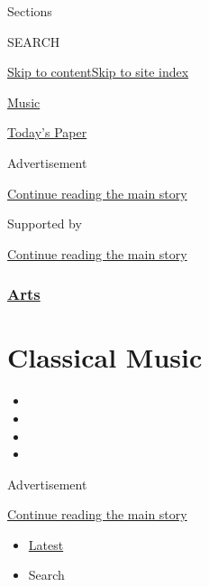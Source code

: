 Sections

SEARCH

\protect\hyperlink{site-content}{Skip to
content}\protect\hyperlink{site-index}{Skip to site index}

\href{https://www.nytimes3xbfgragh.onion/section/arts/music}{Music}

\href{https://myaccount.nytimes3xbfgragh.onion/auth/login?response_type=cookie\&client_id=vi}{}

\href{https://www.nytimes3xbfgragh.onion/section/todayspaper}{Today's
Paper}

Advertisement

\protect\hyperlink{after-top}{Continue reading the main story}

Supported by

\protect\hyperlink{after-sponsor}{Continue reading the main story}

\hypertarget{arts}{%
\subsubsection{\texorpdfstring{\href{/section/arts}{Arts}}{Arts}}\label{arts}}

\hypertarget{classical-music}{%
\section{Classical Music}\label{classical-music}}

\begin{itemize}
\item
\item
\item
\item
\end{itemize}

Advertisement

\protect\hyperlink{after-subheader}{Continue reading the main story}

\begin{itemize}
\tightlist
\item
  \protect\hyperlink{stream-panel}{Latest}
\item
  Search
\end{itemize}

